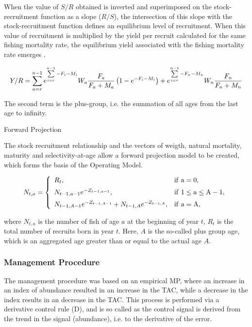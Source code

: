 \documentclass[preprint,12pt]{elsarticle}
\begin{document}
When the value of $S/R$ obtained is inverted and superimposed on the stock-recruitment function as a slope ($R/S$), the intersection of this slope with the stock-recruitment function defines an equilibrium level of recruitment. When this value of recruitment is multiplied by the yield per recruit calculated for the same fishing mortality rate, the equilibrium yield associated with the fishing mortality rate emerges \cite{gabriel1999review}. 

\begin{equation}
Y/R=\sum\limits_{a=r}^{n-1} {e^{\sum\limits_{i=r}^{a-1} {-F_i-M_i}}} W_a\frac{F_a}{F_a+M_a}\left(1-e^{-F_i-M_i} \right) + e^{\sum\limits_{i=r}^{n-1} {-F_n-M_n}} W_n\frac{F_n}{F_n+M_n}\\
\end{equation} 

The second term is the plus-group, i.e. the summation of all ages from the last age to infinity. 

Forward Projection

The stock recruitment relationship and the vectors of weigth, natural mortality, maturity and selectivity-at-age allow a forward projection model to be created, which forms the basis of the Operating Model.

\begin{equation}
N_{t,a} =
\left\{
\begin{array}{ll}
\vspace{0.2cm}
R_t, & \rm{if} \ a=0,\\
\vspace{0.2cm}
N_{t-1,a-1} e^{-Z_{t-1,a-1}}, & \rm{if} \ 1 \leq a \leq A-1,\\
N_{t-1,A-1} e^{-Z_{t-1,A-1}}+N_{t-1,A} e^{-Z_{t-1,A}}, & \rm{if} \ a=A,
\end{array}
\right.
\end{equation}

where $N_{t,a}$ is the number of fish of age $a$ at the beginning of year $t$, $R_t$ is the total number of recruits born in year $t$. Here, $A$ is the so-called plus group age, which is an aggregated age greater than or equal to the actual age $A$.


\subsubsection{Management Procedure}

The management procedure was based on an empirical MP, where an increase in an index of abundance resulted in an increase in the TAC, while a decrease in the index results in an decrease in the TAC. This process is performed via a derivative control rule (D), and is so called as the control signal is derived from the trend in the signal (abundance), i.e. to the derivative of the error. 
\end{document}
